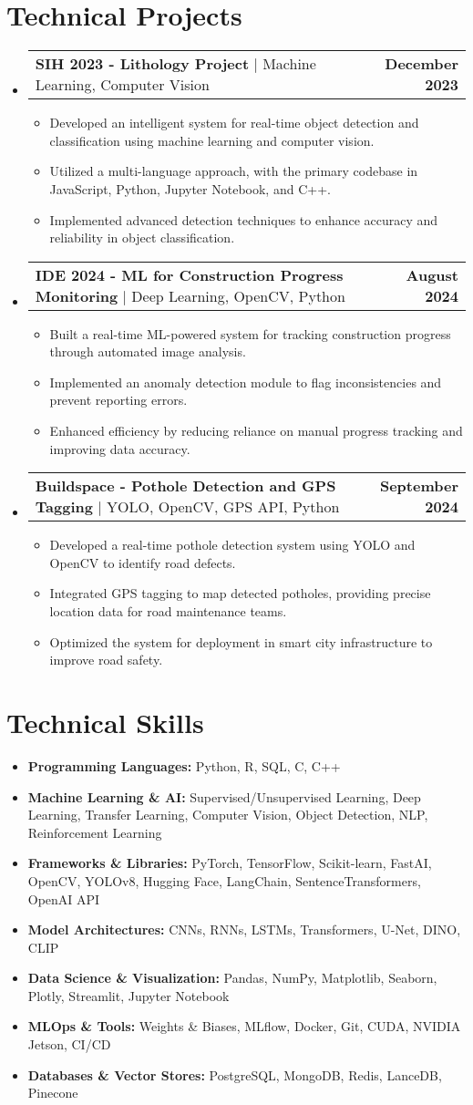 \documentclass[letterpaper,11pt]{article}
\makeatletter
\newcommand{\resumeItem}[1]{
  \item\small{
    {#1 \vspace{-2pt}}
  }
}
\newcommand{\resumeProjectHeading}[2]{
  \item
  \begin{tabular*}{1.0\textwidth}{l@{\extracolsep{\fill}}r}
    \small#1 & \textbf{\small #2}\\
  \end{tabular*}\vspace{-7pt}
}
\newcommand{\resumeSubHeadingListStart}{\begin{itemize}[leftmargin=0.0in, label={}]}
\newcommand{\resumeSubHeadingListEnd}{\end{itemize}}
\newcommand{\resumeItemListStart}{\begin{itemize}}
\newcommand{\resumeItemListEnd}{\end{itemize}\vspace{-5pt}}
\makeatother
\begin{document}
\section{Technical Projects}
\resumeSubHeadingListStart
  \resumeProjectHeading
    {\textbf{SIH 2023 - Lithology Project} $|$ Machine Learning, Computer Vision}{December 2023}
    \resumeItemListStart
      \resumeItem{Developed an intelligent system for real-time object detection and classification using machine learning and computer vision.}
      \resumeItem{Utilized a multi-language approach, with the primary codebase in JavaScript, Python, Jupyter Notebook, and C++.}
      \resumeItem{Implemented advanced detection techniques to enhance accuracy and reliability in object classification.}
    \resumeItemListEnd

  \resumeProjectHeading
    {\textbf{IDE 2024 - ML for Construction Progress Monitoring} $|$ Deep Learning, OpenCV, Python}{August 2024}
    \resumeItemListStart
      \resumeItem{Built a real-time ML-powered system for tracking construction progress through automated image analysis.}
      \resumeItem{Implemented an anomaly detection module to flag inconsistencies and prevent reporting errors.}
      \resumeItem{Enhanced efficiency by reducing reliance on manual progress tracking and improving data accuracy.}
    \resumeItemListEnd

  \resumeProjectHeading
    {\textbf{Buildspace - Pothole Detection and GPS Tagging} $|$ YOLO, OpenCV, GPS API, Python}{September 2024}
    \resumeItemListStart
      \resumeItem{Developed a real-time pothole detection system using YOLO and OpenCV to identify road defects.}
      \resumeItem{Integrated GPS tagging to map detected potholes, providing precise location data for road maintenance teams.}
      \resumeItem{Optimized the system for deployment in smart city infrastructure to improve road safety.}
    \resumeItemListEnd
    
\resumeSubHeadingListEnd

\section{Technical Skills}
\resumeSubHeadingListStart
  \resumeItem{\textbf{Programming Languages:} Python, R, SQL, C, C++}
  \resumeItem{\textbf{Machine Learning \& AI:} Supervised/Unsupervised Learning, Deep Learning, Transfer Learning, Computer Vision, Object Detection, NLP, Reinforcement Learning}
  \resumeItem{\textbf{Frameworks \& Libraries:} PyTorch, TensorFlow, Scikit-learn, FastAI, OpenCV, YOLOv8, Hugging Face, LangChain, SentenceTransformers, OpenAI API}
  \resumeItem{\textbf{Model Architectures:} CNNs, RNNs, LSTMs, Transformers, U-Net, DINO, CLIP}
  \resumeItem{\textbf{Data Science \& Visualization:} Pandas, NumPy, Matplotlib, Seaborn, Plotly, Streamlit, Jupyter Notebook}
  \resumeItem{\textbf{MLOps \& Tools:} Weights \& Biases, MLflow, Docker, Git, CUDA, NVIDIA Jetson, CI/CD}
  \resumeItem{\textbf{Databases \& Vector Stores:} PostgreSQL, MongoDB, Redis, LanceDB, Pinecone}
\resumeSubHeadingListEnd
\end{document}
